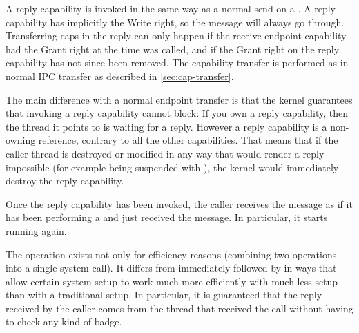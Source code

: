 A reply capability is invoked in the same way as a normal send on a
. A reply capability has implicitly the Write right, so the
message will always go through. Transferring caps in the reply can only happen
if the receive endpoint capability had the Grant right at the time
 was called, and if the Grant right on the reply capability
has not since been removed. The capability transfer is performed as in normal
IPC transfer as described in \autoref{sec:cap-transfer}.

The main difference with a normal endpoint transfer is that the kernel guarantees
that invoking a reply capability cannot block: If you own a reply capability,
then the thread it points to is waiting for a reply. However a reply capability
is a non-owning reference, contrary to all the other capabilities. That means that
if the caller thread is destroyed or modified in any way that would render
a reply impossible (for example being suspended with
), the kernel would immediately destroy
the reply capability.

Once the reply capability has been invoked, the caller receives the message as if
it has been performing a  and just received the
message. In particular, it starts running again.

The  operation exists not only for
efficiency reasons (combining two operations into a single system
call). It differs from
 immediately followed by
 in ways that allow certain system setup to work
much more efficiently with much less setup than with a traditional setup.
In particular, it is guaranteed that the reply received by the caller comes from
the thread that received the call without having to check any kind of badge.
